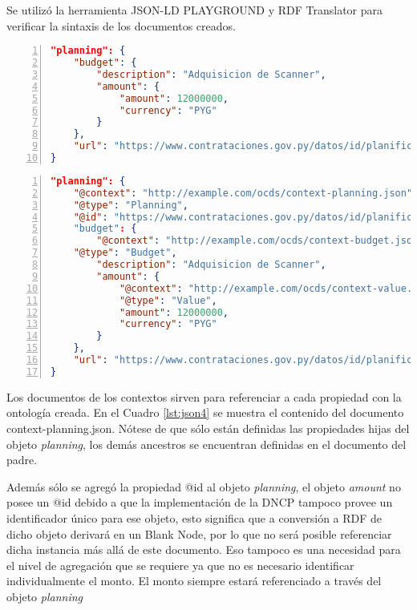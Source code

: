 Se utilizó la herramienta JSON-LD PLAYGROUND \cite{JSONLDPl78:online} y RDF Translator\cite{RDFTrans0:online} para verificar la sintaxis de los documentos creados.\hfill \break

\noindent\begin{minipage}{\textwidth}
\begin{lstlisting}[captionpos=b, caption=Objeto JSON del OCDS de un Planning, label=lst:json2,  numbers=left, language=json, firstnumber=1, numberstyle=\tiny\color{mygray},frame=single]
"planning": {
    "budget": { 
        "description": "Adquisicion de Scanner",
        "amount": {
            "amount": 12000000,
            "currency": "PYG"
        }
    },
    "url": "https://www.contrataciones.gov.py/datos/id/planificaciones/193399-adquisicion-scanner"
}
\end{lstlisting}
\end{minipage}

\hfill \break

\noindent\begin{minipage}{\textwidth}
\begin{lstlisting}[captionpos=b, caption=Objeto JSON-LD del OCDS de un Planning, label=lst:json3,  numbers=left, language=json, firstnumber=1, numberstyle=\tiny\color{mygray},frame=single]
"planning": {
    "@context": "http://example.com/ocds/context-planning.json",
    "@type": "Planning",
    "@id": "https://www.contrataciones.gov.py/datos/id/planificaciones/193399-adquisicion-scanner"
    "budget": { 
        "@context": "http://example.com/ocds/context-budget.json",
    "@type": "Budget",
        "description": "Adquisicion de Scanner",
        "amount": {
            "@context": "http://example.com/ocds/context-value.json",
            "@type": "Value",
            "amount": 12000000,
            "currency": "PYG"
        }
    },
    "url": "https://www.contrataciones.gov.py/datos/id/planificaciones/193399-adquisicion-scanner"
}
\end{lstlisting}
\end{minipage}

Los documentos de los contextos sirven para referenciar a cada propiedad con la ontología creada. En el Cuadro \ref{lst:json4} se muestra el contenido del documento context-planning.json. Nótese de que sólo están definidas las propiedades hijas del objeto \textit{planning}, los demás ancestros se encuentran definidas en el documento del padre.

Además sólo se agregó la propiedad @id al objeto \textit{planning}, el objeto \textit{amount} no posee un @id debido a que la implementación de la DNCP tampoco provee un identificador único para ese objeto, esto significa que a conversión a RDF de dicho objeto derivará en un Blank Node, por lo que no será posible referenciar dicha instancia más allá de este documento. Eso tampoco es una necesidad para el nivel de agregación que se requiere ya que no es necesario identificar individualmente el monto. El monto siempre estará referenciado a través del objeto \textit{planning}

